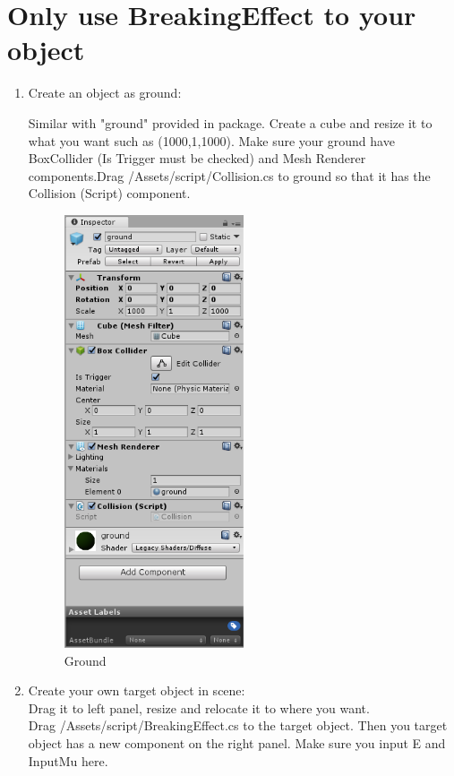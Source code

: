 \documentclass[12pt, titlepage]{article}
\begin{document}
	\section{Only use BreakingEffect to your object} \label{SecUse}
	\begin{enumerate}
	\item {Create an object as ground:}
	
	Similar with "ground" provided in package. Create a cube and resize it to what you want such as (1000,1,1000). Make sure your ground have BoxCollider (Is Trigger must be checked) and Mesh Renderer components.Drag /Assets/script/Collision.cs to ground so that it has the Collision (Script) component.
	
	\begin{figure}[H]
		\centering
		\includegraphics[width=0.5\textwidth]{./Ground.png}
		\caption{Ground}
		\label{FigGround}
	\end{figure}
	
	\item {Create your own target object in scene:}\\
	Drag it to left panel, resize and relocate it to where you want.\\
	Drag /Assets/script/BreakingEffect.cs to the target object. Then you target object has a new component on the right panel. Make sure you input E and InputMu here.
	

\end{enumerate}
\end{document}
